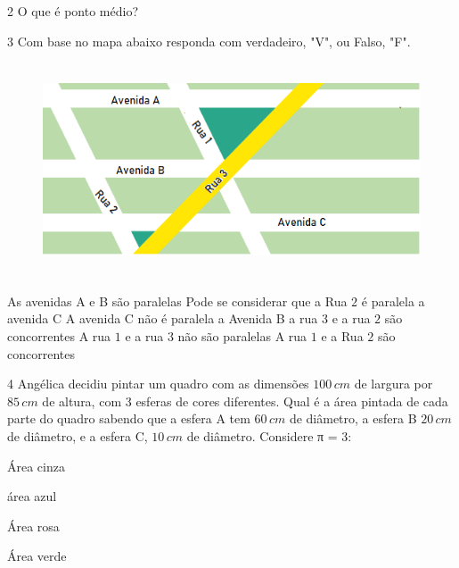 {\begin{escolha}
\item {}
\item {}
\item {}
\item {}
\item {}
\item {}
\end{escolha}

\num{2}  O que é ponto médio?


\num{3}  Com base no mapa abaixo responda com verdadeiro, "V", ou Falso, "F".

\begin{figure}
\includegraphics[width=5.47917in,height=2.48958in]{./imgSAEB_6_MAT/media/image53.png}
\end{figure}

\begin{boxlist}
\boxitem[\rosa{V}] As avenidas A e B são paralelas
\boxitem[\rosa{F}] Pode se considerar que a Rua $2$ é paralela a avenida C
\boxitem[\rosa{F}] A avenida C não é paralela a Avenida B
\boxitem[\rosa{V}] a rua $3$ e a rua $2$ são concorrentes
\boxitem[\rosa{V}] A rua $1$ e a rua $3$ não são paralelas
\boxitem[\rosa{F}] A rua $1$ e a Rua $2$ são concorrentes
\end{boxlist}

\num{4}  Angélica decidiu pintar um quadro com as dimensões $100\,cm$ de largura
por $85\,cm$ de altura, com $3$ esferas de cores diferentes. Qual é a área
pintada de cada parte do quadro sabendo que a esfera A tem $60\,cm$ de
diâmetro, a esfera B $20\,cm$ de diâmetro, e a esfera C, $10\,cm$ de diâmetro. Considere π = $3$:

\begin{escolha}
\item Área cinza 
\item área azul 
\item Área rosa 
\item Área verde 
\end{escolha}

}

